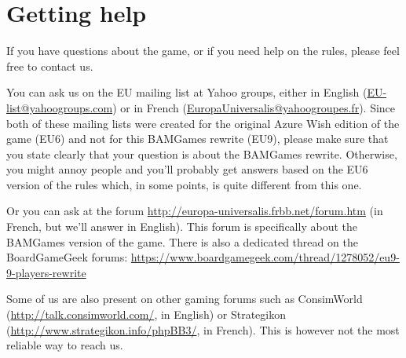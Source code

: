 \section*{Getting help}
If you have questions about the game, or if you need help on the rules, please
feel free to contact us.

You can ask us on the EU mailing list at Yahoo groups, either in English
(\url{EU-list@yahoogroups.com}) or in French
(\url{EuropaUniversalis@yahoogroupes.fr}). Since both of these mailing lists
were created for the original Azure Wish edition of the game (EU6) and not for
this BAMGames rewrite (EU9), please make sure that you state clearly that your
question is about the BAMGames rewrite. Otherwise, you might annoy people and
you'll probably get answers based on the EU6 version of the rules which, in
some points, is quite different from this one.

Or you can ask at the forum \url{http://europa-universalis.frbb.net/forum.htm}
(in French, but we'll answer in English). This forum is specifically about the
BAMGames version of the game. There is also a dedicated thread on the
BoardGameGeek forums:
\url{https://www.boardgamegeek.com/thread/1278052/eu9-9-players-rewrite}

Some of us are also present on other gaming forums such as ConsimWorld
(\url{http://talk.consimworld.com/}, in English) or Strategikon
(\url{http://www.strategikon.info/phpBB3/}, in French). This is however not
the most reliable way to reach us.

